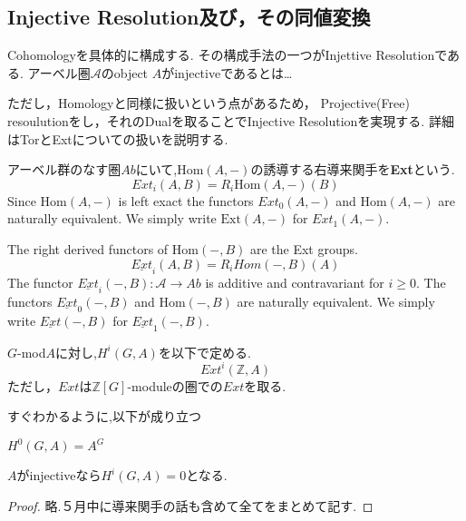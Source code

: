 \documentclass{ujarticle}
\renewenvironment{enumerate}
{
\begin{list}{(\arabic{enumi})}
{
\usecounter{enumi}
\setlength{\topsep}{0zh}
\setlength{\itemindent}{0zw}
\setlength{\leftmargin}{2zw} %
\setlength{\rightmargin}{0zw} %
\setlength{\labelsep}{1zw} %
\setlength{\labelwidth}{3zw} %
\setlength{\itemsep}{0em} %
\setlength{\parsep}{0em} %
\setlength{\listparindent}{1zw} %
}
}{
\end{list}
}
\begin{document}
\subsection{Injective Resolution及び，その同値変換}
\label{sub:Injective Resolution及び，その同値変換}
Cohomologyを具体的に構成する.
その構成手法の一つがInjettive Resolutionである.
アーベル圏$\mathcal{A}$のobject $A$がinjectiveであるとは…

ただし，Homologyと同様に扱いという点があるため，
Projective(Free) resoulutionをし，それのDualを取ることでInjective Resolutionを実現する.
詳細はTorとExtについての扱いを説明する.

\begin{dfn}
アーベル群のなす圏$Ab$にいて,$\mathrm{Hom}(A, −)$の誘導する右導来関手を\textbf{Ext}という.
\begin{equation*}
  Ext_i(A, B) = R_i\mathrm{Hom}(A, −)(B)
\end{equation*}
Since $\mathrm{Hom}(A, −)$ is left exact the functors $Ext_0
(A, −)$ and $\mathrm{Hom}(A, −)$ are naturally equivalent. We simply write
$\mathrm{Ext}(A, −)$ for $Ext_1(A, −)$.
\end{dfn}

\begin{dfn}
The right derived functors of $\mathrm{Hom}(−, B)$ are the Ext groups.
\begin{equation*}
  \underline{Ext}_i(A, B) = R_iHom(−, B)(A)
\end{equation*}
 The functor $\underline{Ext}_i(−, B) : \mathcal{A} \to Ab$ is additive and contravariant for $i \ge 0$.
 The functors
 $\underline{Ext}_0(−, B)$ and $\mathrm{Hom}(−, B)$ are naturally equivalent.
We simply write $\underline{Ext}(−, B)$ for $\underline{Ext}_1(−, B)$.
\end{dfn}

\begin{dfn}
 $G$-mod$A$に対し,$H^i(G,A)$を以下で定める.
 \begin{equation*}
  Ext^i(\mathbb{Z},A)
 \end{equation*}
 ただし，$Ext$は$\mathbb{Z}[G]$-moduleの圏での$Ext$を取る.
\end{dfn}
すぐわかるように,以下が成り立つ
\begin{lem}
 \begin{enumerate}
   \item $H^0(G,A)=A^G$
   \item $A$がinjectiveなら$H^i(G,A)=0$となる.
 \end{enumerate}
\end{lem}
\begin{proof}
 略.５月中に導来関手の話も含めて全てをまとめて記す.
\end{proof}
\end{document}
